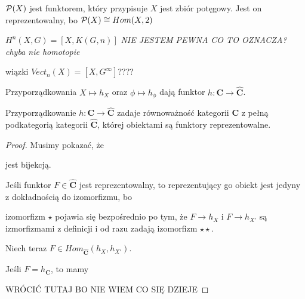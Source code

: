 \begin{example}
  \item $\mathcal{P}(X)$ jest funktorem, który przypisuje $X$ jest zbiór potęgowy. Jest on reprezentowalny, bo $\mathcal{P}(X)\cong Hom(X, 2)$
  \item $H^n(X,G)=[X,K(G, n)]$ \emph{\large\color{red}NIE JESTEM PEWNA CO TO OZNACZA? chyba nie homotopie}
  \item wiązki $Vect_n(X)=[X,G^\infty]$????
\end{example}

Przyporządkowania $X\mapsto h_X$ oraz $\phi\mapsto h_\phi$ dają funktor $h:\mathbf{C}\to\mathbf{\hat{C}}$.

\begin{lemma}
  Przyporządkowanie $h:\mathbf{C}\to\mathbf{\hat{C}}$ zadaje równoważność kategorii $\mathbf{C}$ z pełną podkategorią kategorii $\mathbf{\hat{C}}$, której obiektami są funktory reprezentowalne.
\end{lemma}

\begin{proof}
  Musimy pokazać, że

  \begin{center}\end{center}

  jest bijekcją.
  
  Jeśli funktor $F\in\mathbf{\hat{C}}$ jest reprezentowalny, to reprezentujący go obiekt jest jedyny z dokładnością do izomorfizmu, bo

  \begin{center}\end{center}

  izomorfizm $\star$ pojawia się bezpośrednio po tym, że $F\to h_X$ i $F\to h_{X'}$ są izmorfizmami z definicji i od razu zadają izomorfizm $\star\star$.

  Niech teraz $F\in Hom_{\mathbf{\hat{C}}}(h_X,h_{X'})$.

  Jeśli $F=h_{\mathbf{C}}$, to mamy
  \begin{center}\end{center}

  {\large\color{red}WRÓCIĆ TUTAJ BO NIE WIEM CO SIĘ DZIEJE}

\end{proof}

